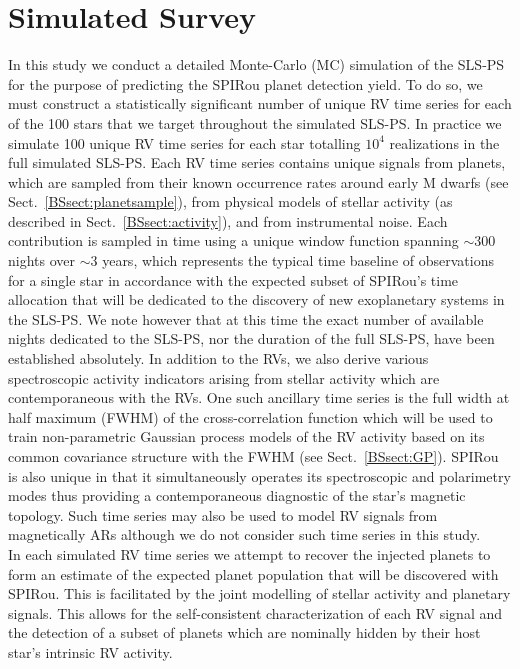 \section{Simulated Survey} \label{BSsect:survey}
In this study we conduct a detailed Monte-Carlo (MC) simulation of the SLS-PS for the purpose of
predicting the SPIRou planet detection yield. To do so, we must construct a statistically significant
number of unique RV time series for each of the 100 stars that we target throughout the simulated SLS-PS.
In practice we simulate 100 unique RV time series for each star totalling $10^4$ realizations in the full
simulated SLS-PS. Each RV time series contains unique signals from planets, which are sampled from their
known occurrence rates around early M dwarfs (see Sect.~\ref{BSsect:planetsample}), from physical models
of stellar activity (as described in Sect.~\ref{BSsect:activity}), and from instrumental noise.
Each contribution is sampled
in time using a unique window function spanning $\sim 300$ nights over $\sim 3$ years,
which represents the typical time baseline of observations for a single star
in accordance with the expected subset of SPIRou's time allocation that will be dedicated to the
discovery of new exoplanetary systems in the SLS-PS. We note however that at this time the exact number of available
nights dedicated to the SLS-PS, nor the duration of the full SLS-PS, have been established absolutely. In addition
to the RVs, we also derive various spectroscopic activity indicators arising from stellar activity
which are contemporaneous with the RVs. One such ancillary time series is the full width at half maximum
(FWHM) of the cross-correlation function which will be used to
train non-parametric Gaussian process models of the RV activity based on its common covariance structure with
the FWHM (see Sect.~\ref{BSsect:GP}). SPIRou is also unique in that it simultaneously operates its spectroscopic and
polarimetry modes thus providing a contemporaneous diagnostic of the star's magnetic topology. Such time series
may also
be used to model RV signals from magnetically ARs \citep{hebrard16} although we do not consider
such time series in this study. \\

In each
simulated RV time series we attempt to recover the injected planets to form an estimate of the expected
planet population that will be discovered with SPIRou. This is facilitated by the joint modelling of stellar
activity and planetary signals. This allows for the self-consistent characterization of each RV signal and the
detection of a subset of planets which are nominally hidden by their host star's intrinsic RV activity.


